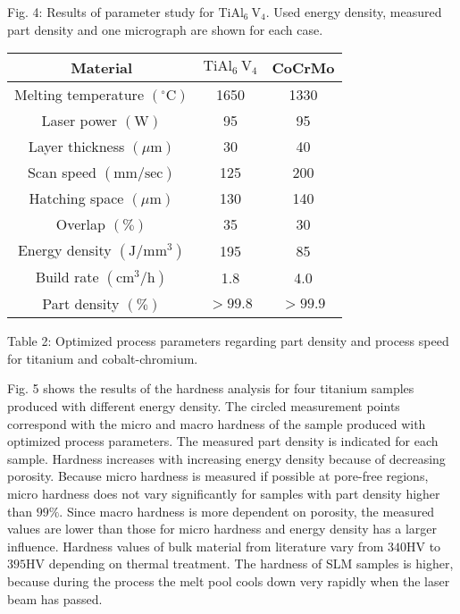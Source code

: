 \documentclass[10pt]{article}
\begin{document}
Fig. 4: Results of parameter study for $\mathrm{TiAl}_{6} \mathrm{~V}_{4}$. Used energy density, measured part density and one micrograph are shown for each case.

\begin{center}
\begin{tabular}{|c||c|c||}
\hline
Material & $\mathrm{TiAl}_{6} \mathrm{~V}_{4}$ & CoCrMo \\
\hline
Melting temperature $\left({ }^{\circ} \mathrm{C}\right)$ & 1650 & 1330 \\
\hline\hline
Laser power $(\mathrm{W})$ & 95 & 95 \\
\hline
Layer thickness $(\mu \mathrm{m})$ & 30 & 40 \\
\hline
Scan speed $(\mathrm{mm} / \mathrm{sec})$ & 125 & 200 \\
\hline
Hatching space $(\mu \mathrm{m})$ & 130 & 140 \\
Overlap $(\%)$ & 35 & 30 \\
\hline
Energy density $\left(\mathrm{J} / \mathrm{mm}^{3}\right)$ & 195 & 85 \\
\hline
Build rate $\left(\mathrm{cm}^{3} / \mathrm{h}\right)$ & 1.8 & 4.0 \\
\hline
Part density $(\%)$ & $>99.8$ & $>99.9$ \\
\hline
\end{tabular}
\end{center}

Table 2: Optimized process parameters regarding part density and process speed for titanium and cobalt-chromium.

Fig. 5 shows the results of the hardness analysis for four titanium samples produced with different energy density. The circled measurement points correspond with the micro and macro hardness of the sample produced with optimized process parameters. The measured part density is indicated for each sample. Hardness increases with increasing energy density because of decreasing porosity. Because micro hardness is measured if possible at pore-free regions, micro hardness does not vary significantly for samples with part density higher than $99 \%$. Since macro hardness is more dependent on porosity, the measured values are lower than those for micro hardness and energy density has a larger influence. Hardness values of bulk material from literature vary from $340 \mathrm{HV}$ to $395 \mathrm{HV}$ depending on thermal treatment. The hardness of SLM samples is higher, because during the process the melt pool cools down very rapidly when the laser beam has passed.
\end{document}
